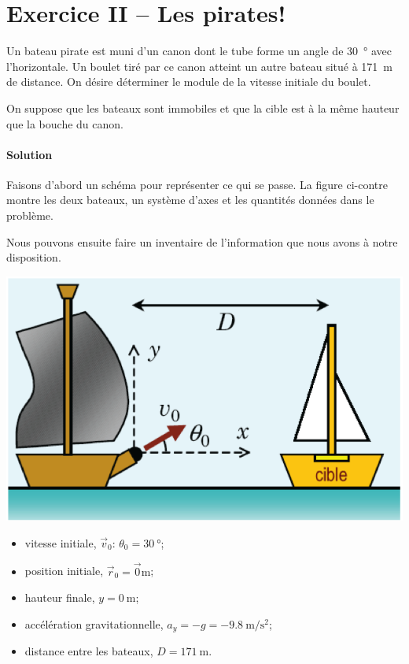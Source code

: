 \documentclass{tufte-handout}
\begin{document}
\begin{enumerate}
\end{enumerate}

\newpage

\section{Exercice II -- Les pirates!}

Un bateau pirate est muni d'un canon dont le tube forme un angle de
\SI{30}{\degree} avec l'horizontale. Un boulet tiré par ce canon atteint un
autre bateau situé à \SI{171}{\meter} de distance.  On désire déterminer le
module de la vitesse initiale du boulet.

On suppose que les bateaux sont immobiles et que la cible est à la même
hauteur que la bouche du canon.

\paragraph{Solution}

Faisons d'abord un schéma pour représenter ce qui se passe.  La figure
ci-contre montre les deux bateaux, un système d'axes et les quantités données
dans le problème.

Nous pouvons ensuite faire un inventaire de l'information que nous avons à
notre disposition.

\begin{marginfigure}
  \includegraphics[scale=0.6]{pirates.png}
\end{marginfigure}

\begin{itemize}
  \item vitesse initiale, $\vec{v}_0$: $\theta_0 = \SI{30}{\degree}$;
  \item position initiale, $\vec{r}_0 = \vec{0}\si{\meter}$;
  \item hauteur finale, $y = \SI{0}{\meter}$;
  \item accélération gravitationnelle, $a_y =
    -g = \SI{-9.8}{\meter\per\second\squared}$;
  \item distance entre les bateaux, $D = \SI{171}{\meter}$.
\end{itemize}
\end{document}

